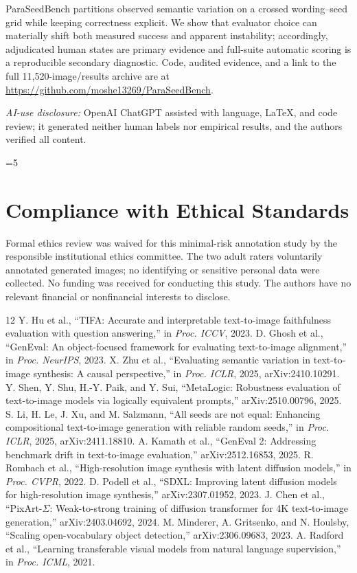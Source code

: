 \documentclass[10pt,letterpaper]{article}
\begin{document}
ParaSeedBench partitions observed semantic variation on a crossed wording--seed grid while keeping correctness explicit. We show that evaluator choice can materially shift both measured success and apparent instability; accordingly, adjudicated human states are primary evidence and full-suite automatic scoring is a reproducible secondary diagnostic. Code, audited evidence, and a link to the full 11,520-image/results archive are at \url{https://github.com/moshe13269/ParaSeedBench}.

\noindent\textit{AI-use disclosure:} OpenAI ChatGPT assisted with language, \LaTeX{}, and code review; it generated neither human labels nor empirical results, and the authors verified all content.

\clearpage
\ifnum\value{page}=5\relax\else\PackageError{ParaSeedBench}{Technical content must occupy exactly four pages}{Expected permitted page-5 material to begin on page 5.}\fi
\section*{Compliance with Ethical Standards}
Formal ethics review was waived for this minimal-risk annotation study by the responsible institutional ethics committee. The two adult raters voluntarily annotated generated images; no identifying or sensitive personal data were collected. No funding was received for conducting this study. The authors have no relevant financial or nonfinancial interests to disclose.

\begin{thebibliography}{12}
 Y. Hu et al., ``TIFA: Accurate and interpretable text-to-image faithfulness evaluation with question answering,'' in \emph{Proc. ICCV}, 2023.
 D. Ghosh et al., ``GenEval: An object-focused framework for evaluating text-to-image alignment,'' in \emph{Proc. NeurIPS}, 2023.
 X. Zhu et al., ``Evaluating semantic variation in text-to-image synthesis: A causal perspective,'' in \emph{Proc. ICLR}, 2025, arXiv:2410.10291.
 Y. Shen, Y. Shu, H.-Y. Paik, and Y. Sui, ``MetaLogic: Robustness evaluation of text-to-image models via logically equivalent prompts,'' arXiv:2510.00796, 2025.
 S. Li, H. Le, J. Xu, and M. Salzmann, ``All seeds are not equal: Enhancing compositional text-to-image generation with reliable random seeds,'' in \emph{Proc. ICLR}, 2025, arXiv:2411.18810.
 A. Kamath et al., ``GenEval 2: Addressing benchmark drift in text-to-image evaluation,'' arXiv:2512.16853, 2025.
 R. Rombach et al., ``High-resolution image synthesis with latent diffusion models,'' in \emph{Proc. CVPR}, 2022.
 D. Podell et al., ``SDXL: Improving latent diffusion models for high-resolution image synthesis,'' arXiv:2307.01952, 2023.
 J. Chen et al., ``PixArt-$\Sigma$: Weak-to-strong training of diffusion transformer for 4K text-to-image generation,'' arXiv:2403.04692, 2024.
 M. Minderer, A. Gritsenko, and N. Houlsby, ``Scaling open-vocabulary object detection,'' arXiv:2306.09683, 2023.
 A. Radford et al., ``Learning transferable visual models from natural language supervision,'' in \emph{Proc. ICML}, 2021.
\end{thebibliography}
\end{document}

